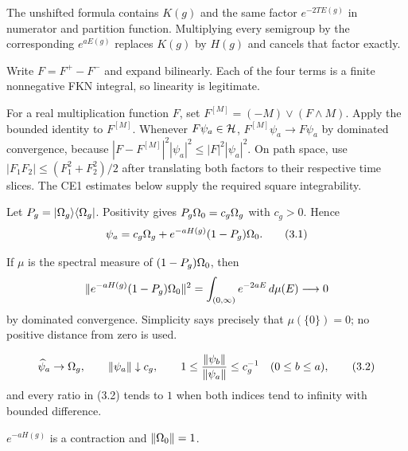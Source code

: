 \documentclass[11pt,a4paper]{article}
\begin{document}
\Because The unshifted formula contains $K(g)$ and the same factor $e^{-2TE(g)}$
in numerator and partition function.  Multiplying every semigroup by the corresponding
$e^{aE(g)}$ replaces $K(g)$ by $H(g)$ and cancels that factor exactly.


\Because Write $F=F^+-F^-$ and expand bilinearly.  Each of the four terms is a
finite nonnegative FKN integral, so linearity is legitimate.


\Because For a real multiplication function $F$, set
$F^{[M]}=(-M)\vee(F\wedge M)$.  Apply the bounded identity to $F^{[M]}$.
Whenever $F\psi_a\in\mathcal H$, $F^{[M]}\psi_a\to F\psi_a$ by dominated convergence,
because $|F-F^{[M]}|^2|\psi_a|^2\leq |F|^2|\psi_a|^2$.  On path space, use
$|F_1F_2|\leq(F_1^2+F_2^2)/2$ after translating both factors to their respective
time slices.  The CE1 estimates below supply the required square integrability.

\QedStep


Let $P_g=|\Omega_g\rangle\langle\Omega_g|$.  Positivity gives
$P_g\Omega_0=c_g\Omega_g$ with $c_g>0$.  Hence
\[
 \psi_a=c_g\Omega_g+e^{-aH(g)}(1-P_g)\Omega_0.                            \tag{3.1}
\]


\Because If $\mu$ is the spectral measure of $(1-P_g)\Omega_0$, then
\[
 \|e^{-aH(g)}(1-P_g)\Omega_0\|^2
   =\int_{(0,\infty)}e^{-2aE}\,d\mu(E)\longrightarrow0
\]
by dominated convergence.  Simplicity says precisely that $\mu(\{0\})=0$; no
positive distance from zero is used.

\[
 \widehat\psi_a\to\Omega_g,\qquad
 \|\psi_a\|\downarrow c_g,\qquad
 1\leq\frac{\|\psi_b\|}{\|\psi_a\|}\leq c_g^{-1}\quad(0\leq b\leq a), \tag{3.2}
\]
and every ratio in (3.2) tends to $1$ when both indices tend to infinity with
bounded difference.

\Because $e^{-aH(g)}$ is a contraction and $\|\Omega_0\|=1$.

\QedStep

\end{document}
